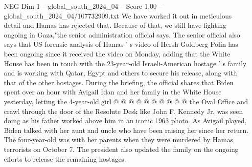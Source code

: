 \begin{textsample}{NEG Dim 1 – global\_south\_2024\_04 – Score 1.00 – global\_south\_2024\_04/107732909.txt}
We have worked it out in meticulous detail and Hamas has rejected that.
Because of that, we still have fighting ongoing in Gaza,"the senior administration official says.
The senior official also says that US forensic analysis of Hamas ' s video of Hersh Goldberg-Polin has been ongoing since it received the video on Monday, adding that the White House has been in touch with the 23-year-old Israeli-American hostage ' s family and is working with Qatar, Egypt and others to secure his release, along with that of the other hostages.
During the briefing, the official shares that Biden spent over an hour with Avigail Idan and her family in the White House yesterday, letting the 4-year-old girl @ @ @ @ @ @ @ @ @ @ the Oval Office and crawl through the door of the Resolute Desk like John F.
Kennedy Jr. was seen doing as his father worked above him in an iconic 1963 photo.
As Avigail played, Biden talked with her aunt and uncle who have been raising her since her return.
The four-year-old was with her parents when they were murdered by Hamas terrorists on October 7.
The president also updated the family on the ongoing efforts to release the remaining hostages.

\end{textsample}
